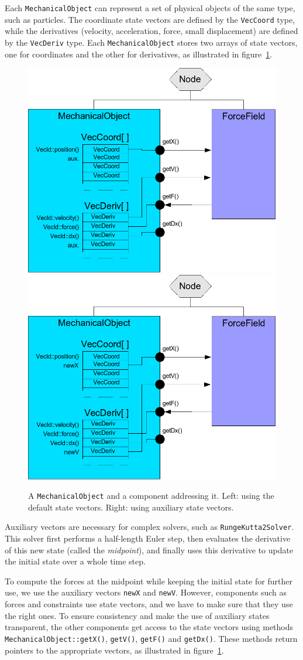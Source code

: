 Each \texttt{MechanicalObject} can represent a set of physical objects of the same type, such as particles. 
The coordinate state vectors are defined by the \texttt{VecCoord} type, while the derivatives (velocity, acceleration, force, small displacement) are defined by the \texttt{VecDeriv} type.
Each \texttt{MechanicalObject} stores two arrays of state vectors, one for coordinates and the other for derivatives, as illustrated in figure~\ref{fig:mechanicalobject}.
\begin{figure}
 \centering
 \includegraphics[width=0.45\linewidth]{MechanicalObject1}
\includegraphics[width=0.45\linewidth]{MechanicalObject2}
  \caption{A \texttt{MechanicalObject} and a component addressing it. Left: using the default state vectors. Right: using auxiliary state vectors.}
 \label{fig:mechanicalobject}
\end{figure}

Auxiliary vectors are necessary for complex solvers, such as \texttt{RungeKutta2Solver}. This solver first performs a half-length Euler step, then evaluates the derivative of this new state (called the \emph{midpoint}), and finally uses this derivative to update the initial state over a whole time step.

To compute the forces at the midpoint while keeping the initial state for further use, we use the auxiliary vectors \texttt{newX} and \texttt{newV}. 
However, components such as forces and constraints use state vectors, and we have to make sure that they use the right ones.
To ensure consistency and make the use of auxiliary states transparent, the other components get access to the state vectors using methods \texttt{MechanicalObject::getX()}, \texttt{getV()}, \texttt{getF()} and  \texttt{getDx()}. 
These methods return pointers to the appropriate vectors, as illustrated in figure~\ref{fig:mechanicalobject}.

